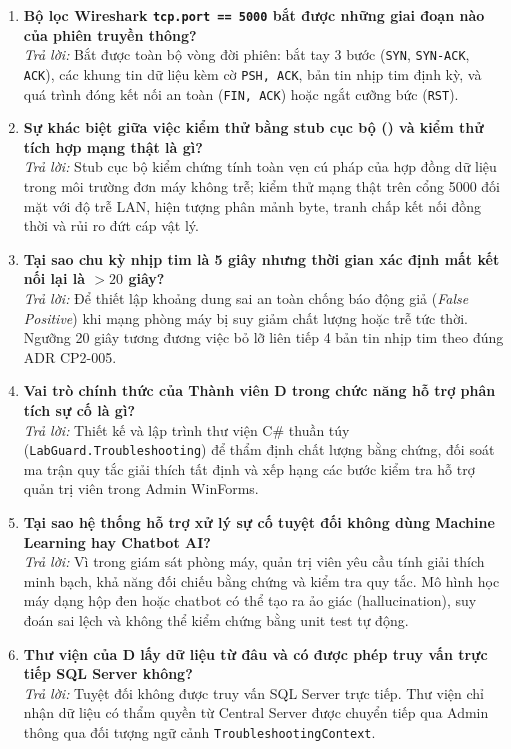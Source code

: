\documentclass[12pt,a4paper]{article}
\begin{document}
\begin{enumerate}[label=\textbf{\arabic*.}]
  \item \textbf{Bộ lọc Wireshark \texttt{tcp.port == 5000} bắt được những giai đoạn nào của phiên truyền thông?} \\
    \textit{Trả lời:} Bắt được toàn bộ vòng đời phiên: bắt tay 3 bước (\texttt{SYN}, \texttt{SYN-ACK}, \texttt{ACK}), các khung tin dữ liệu kèm cờ \texttt{PSH, ACK}, bản tin nhịp tim định kỳ, và quá trình đóng kết nối an toàn (\texttt{FIN, ACK}) hoặc ngắt cưỡng bức (\texttt{RST}).

  \item \textbf{Sự khác biệt giữa việc kiểm thử bằng stub cục bộ () và kiểm thử tích hợp mạng thật là gì?} \\
    \textit{Trả lời:} Stub cục bộ kiểm chứng tính toàn vẹn cú pháp của hợp đồng dữ liệu trong môi trường đơn máy không trễ; kiểm thử mạng thật trên cổng 5000 đối mặt với độ trễ LAN, hiện tượng phân mảnh byte, tranh chấp kết nối đồng thời và rủi ro đứt cáp vật lý.

  \item \textbf{Tại sao chu kỳ nhịp tim là 5 giây nhưng thời gian xác định mất kết nối lại là $> 20$ giây?} \\
    \textit{Trả lời:} Để thiết lập khoảng dung sai an toàn chống báo động giả (\textit{False Positive}) khi mạng phòng máy bị suy giảm chất lượng hoặc trễ tức thời. Ngưỡng 20 giây tương đương việc bỏ lỡ liên tiếp 4 bản tin nhịp tim theo đúng ADR CP2-005.

  \item \textbf{Vai trò chính thức của Thành viên D trong chức năng hỗ trợ phân tích sự cố là gì?} \\
    \textit{Trả lời:} Thiết kế và lập trình thư viện C\# thuần túy (\texttt{LabGuard.Troubleshooting}) để thẩm định chất lượng bằng chứng, đối soát ma trận quy tắc giải thích tất định và xếp hạng các bước kiểm tra hỗ trợ quản trị viên trong Admin WinForms.

  \item \textbf{Tại sao hệ thống hỗ trợ xử lý sự cố tuyệt đối không dùng Machine Learning hay Chatbot AI?} \\
    \textit{Trả lời:} Vì trong giám sát phòng máy, quản trị viên yêu cầu tính giải thích minh bạch, khả năng đối chiếu bằng chứng và kiểm tra quy tắc. Mô hình học máy dạng hộp đen hoặc chatbot có thể tạo ra ảo giác (hallucination), suy đoán sai lệch và không thể kiểm chứng bằng unit test tự động.

  \item \textbf{Thư viện của D lấy dữ liệu từ đâu và có được phép truy vấn trực tiếp SQL Server không?} \\
    \textit{Trả lời:} Tuyệt đối không được truy vấn SQL Server trực tiếp. Thư viện chỉ nhận dữ liệu có thẩm quyền từ Central Server được chuyển tiếp qua Admin thông qua đối tượng ngữ cảnh \texttt{TroubleshootingContext}.


\end{enumerate}
\end{document}
